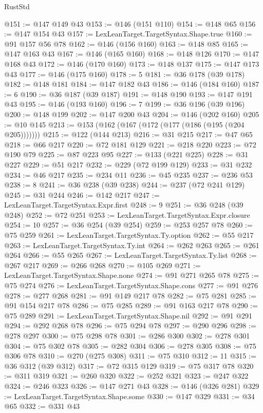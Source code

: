 \begin{lexlean}{RustStd}
\begin{coremodule}
@151 := @147 @149 @43
@153 := @146 (@151 @110)
@154 := @148 @65
@156 := @147 @154 @43
@157 := LexLeanTarget.TargetSyntax.Shape.true
@160 := @91 @157 @56 @78
@162 := @146 (@156 @160)
@163 := @148 @85
@165 := @147 @163 @43
@167 := @146 (@165 @160)
@168 := @148 @126
@170 := @147 @168 @43
@172 := @146 (@170 @160)
@173 := @148 @137
@175 := @147 @173 @43
@177 := @146 (@175 @160)
@178 := 5
@181 := @36 @178 (@39 @178)
@182 := @148 @181
@184 := @147 @182 @43
@186 := @146 (@184 @160)
@187 := 6
@190 := @36 @187 (@39 @187)
@191 := @148 @190
@193 := @147 @191 @43
@195 := @146 (@193 @160)
@196 := 7
@199 := @36 @196 (@39 @196)
@200 := @148 @199
@202 := @147 @200 @43
@204 := @146 (@202 @160)
@205 := @10 @145
@213 := @153 (@162 (@167 (@172 (@177 (@186 (@195 (@204 @205)))))))
@215 := @122 (@144 @213)
@216 := @31 @215
@217 := @47 @65
@218 := @66 @217
@220 := @72 @181 @129
@221 := @218 @220
@223 := @72 @190 @79
@225 := @87 @223 @95
@227 := @133 (@221 @225)
@228 := @31 @227
@229 := @51 @217
@232 := @229 (@72 @199 @129)
@233 := @31 @232
@234 := @46 @217
@235 := @234 @11
@236 := @45 @235
@237 := @236 @53
@238 := 8
@241 := @36 @238 (@39 @238)
@244 := @237 (@72 @241 @129)
@245 := @31 @244
@246 := @142 @217
@247 := LexLeanTarget.TargetSyntax.Expr.first
@248 := 9
@251 := @36 @248 (@39 @248)
@252 := @72 @251
@253 := LexLeanTarget.TargetSyntax.Expr.closure
@254 := 10
@257 := @36 @254 (@39 @254)
@259 := @253 @257 @78
@260 := @75 @259
@261 := LexLeanTarget.TargetSyntax.Ty.option
@262 := @55 @217
@263 := LexLeanTarget.TargetSyntax.Ty.int
@264 := @262 @263
@265 := @261 @264
@266 := @55 @265
@267 := LexLeanTarget.TargetSyntax.Ty.list
@268 := @267 @217
@269 := @266 @268
@270 := @105 @269
@271 := LexLeanTarget.TargetSyntax.Shape.none
@274 := @91 @271 @265 @78
@275 := @75 @274
@276 := LexLeanTarget.TargetSyntax.Shape.cons
@277 := @91 @276
@278 := @277 @268
@281 := @91 @149 @217 @78
@282 := @75 @281
@285 := @91 @154 @217 @78
@286 := @75 @285
@289 := @91 @163 @217 @78
@290 := @75 @289
@291 := LexLeanTarget.TargetSyntax.Shape.nil
@292 := @91 @291
@294 := @292 @268 @78
@296 := @75 @294 @78
@297 := @290 @296
@298 := @278 @297
@300 := @75 @298 @78
@301 := @286 @300
@302 := @278 @301
@304 := @75 @302 @78
@305 := @282 @304
@306 := @278 @305
@308 := @75 @306 @78
@310 := @270 (@275 @308)
@311 := @75 @310
@312 := 11
@315 := @36 @312 (@39 @312)
@317 := @72 @315 @129
@319 := @75 @317 @78
@320 := @311 @319
@321 := @260 @320
@322 := @252 @321
@323 := @247 @322
@324 := @246 @323
@326 := @147 @271 @43
@328 := @146 (@326 @281)
@329 := LexLeanTarget.TargetSyntax.Shape.some
@330 := @147 @329
@331 := @34 @65
@332 := @331 @43

\end{coremodule}
\end{lexlean}
